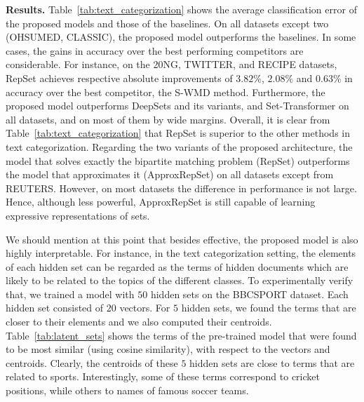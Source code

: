 \documentclass[twoside]{article}
\begin{document}
\noindent\textbf{Results.}
Table~\ref{tab:text_categorization} shows the average classification error of the proposed models and those of the baselines.
On all datasets except two (OHSUMED, CLASSIC), the proposed model outperforms the baselines.
In some cases, the gains in accuracy over the best performing competitors are considerable.
For instance, on the 20NG, TWITTER, and RECIPE datasets, RepSet achieves respective absolute improvements of $3.82\%$, $2.08\%$ and $0.63\%$ in accuracy over the best competitor, the S-WMD method.
Furthermore, the proposed model outperforms DeepSets and its variants, and Set-Transformer on all datasets, and on most of them by wide margins.
Overall, it is clear from Table~\ref{tab:text_categorization} that RepSet is superior to the other methods in text categorization.
Regarding the two variants of the proposed architecture, the model that solves exactly the bipartite matching problem (RepSet) outperforms the model that approximates it (ApproxRepSet) on all datasets except from REUTERS.
However, on most datasets the difference in performance is not large.
Hence, although less powerful, ApproxRepSet is still capable of learning expressive representations of sets.

We should mention at this point that besides effective, the proposed model is also highly interpretable.
For instance, in the text categorization setting, the elements of each hidden set can be regarded as the terms of hidden documents which are likely to be related to the topics of the different classes.
To experimentally verify that, we trained a model with $50$ hidden sets on the BBCSPORT dataset.
Each hidden set consisted of $20$ vectors.
For $5$ hidden sets, we found the terms that are closer to their elements and we also computed their centroids.
Table~\ref{tab:latent_sets} shows the terms of the pre-trained model that were found to be most similar (using cosine similarity), with respect to the vectors and centroids.
Clearly, the centroids of these $5$ hidden sets are close to terms that are related to sports.
Interestingly, some of these terms correspond to cricket positions, while others to names of famous soccer teams.
\end{document}
